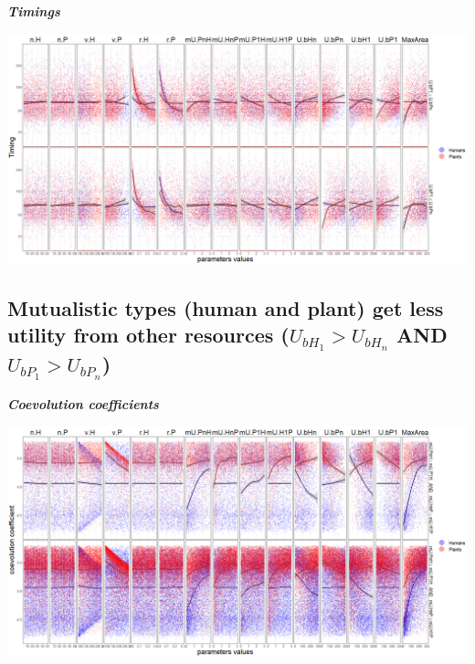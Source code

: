 \documentclass[
]{book}
\begin{document}
\textbf{\emph{Timings}}

\includegraphics[width=1\linewidth]{plots/5_multiplePar-timing-plantLessBase-ggplot}

\newpage

\hypertarget{mutualistic-types-human-and-plant-get-less-utility-from-other-resources-u_bh_1u_bh_n-and-u_bp_1u_bp_n}{%
\subsection{\texorpdfstring{Mutualistic types (human and plant) get less utility from other resources (\(U_{bH_{1}}>U_{bH_{n}}\) AND \(U_{bP_{1}}>U_{bP_{n}}\))}{Mutualistic types (human and plant) get less utility from other resources (U\_\{bH\_\{1\}\}\textgreater U\_\{bH\_\{n\}\} AND U\_\{bP\_\{1\}\}\textgreater U\_\{bP\_\{n\}\})}}\label{mutualistic-types-human-and-plant-get-less-utility-from-other-resources-u_bh_1u_bh_n-and-u_bp_1u_bp_n}}


\textbf{\emph{Coevolution coefficients}}

\includegraphics[width=1\linewidth]{plots/5_multiplePar-coevo-bothLessBase-ggplot}
\end{document}
